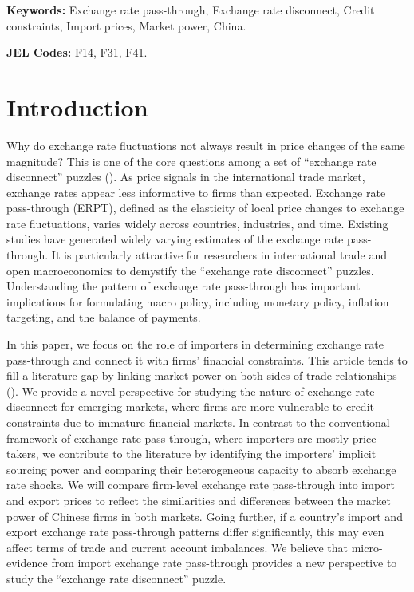 \textbf{Keywords:} Exchange rate pass-through, Exchange rate disconnect, Credit constraints, Import prices, Market power, China.

\textbf{JEL Codes:} F14, F31, F41.

\section{Introduction} \label{Introduction}

Why do exchange rate fluctuations not always result in price changes of the same magnitude? This is one of the core questions among a set of ``exchange rate disconnect'' puzzles (\cite{obstfeld2000}). As price signals in the international trade market, exchange rates appear less informative to firms than expected. Exchange rate pass-through (ERPT), defined as the elasticity of local price changes to exchange rate fluctuations, varies widely across countries, industries, and time. Existing studies have generated widely varying estimates of the exchange rate pass-through. It is particularly attractive for researchers in international trade and open macroeconomics to demystify the ``exchange rate disconnect'' puzzles. Understanding the pattern of exchange rate pass-through has important implications for formulating macro policy, including monetary policy, inflation targeting, and the balance of payments.

In this paper, we focus on the role of importers in determining exchange rate pass-through and connect it with firms' financial constraints. This article tends to fill a literature gap by linking market power on both sides of trade relationships (\cite{alviarez2023}). We provide a novel perspective for studying the nature of exchange rate disconnect for emerging markets, where firms are more vulnerable to credit constraints due to immature financial markets. In contrast to the conventional framework of exchange rate pass-through, where importers are mostly price takers, we contribute to the literature by identifying the importers' implicit sourcing power and comparing their heterogeneous capacity to absorb exchange rate shocks. We will compare firm-level exchange rate pass-through into import and export prices to reflect the similarities and differences between the market power of Chinese firms in both markets. Going further, if a country's import and export exchange rate pass-through patterns differ significantly, this may even affect terms of trade and current account imbalances. We believe that micro-evidence from import exchange rate pass-through provides a new perspective to study the ``exchange rate disconnect'' puzzle.

